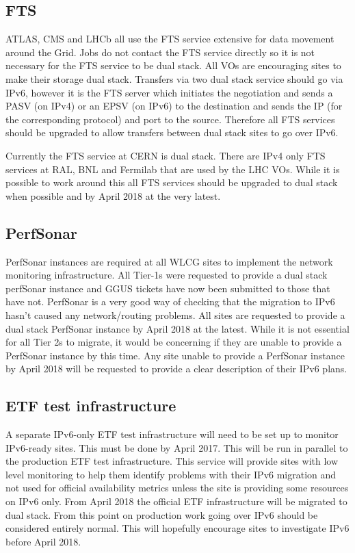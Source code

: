 \documentclass[a4paper]{jpconf}
\begin{document}
\subsection{FTS}
ATLAS, CMS and LHCb all use the FTS service extensive for data movement around the Grid.  Jobs do not contact the FTS service directly so it is not necessary for the FTS service to be dual stack.  All VOs are encouraging sites to make their storage dual stack.  Transfers via two dual stack service should go via IPv6, however it is the FTS server which initiates the negotiation and sends a PASV (on IPv4) or an EPSV (on IPv6) to the destination and sends the IP (for the corresponding protocol) and port to the source.  Therefore all FTS services should be upgraded to allow transfers between dual stack sites to go over IPv6.  

Currently the FTS service at CERN is dual stack.  There are IPv4 only FTS services at RAL, BNL and Fermilab that are used by the LHC VOs.  While it is possible to work around this all FTS services should be upgraded to dual stack when possible and by April 2018 at the very latest. 

\subsection{PerfSonar}
PerfSonar instances are required at all WLCG sites to implement the network monitoring infrastructure. All Tier-1s were requested to provide a dual stack perfSonar instance and GGUS tickets have now been submitted to those that have not.  PerfSonar is a very good way of checking that the migration to IPv6 hasn't caused any network/routing problems.  All sites are requested to provide a dual stack PerfSonar instance by April 2018 at the latest. While it is not essential for all Tier 2s to migrate, it would be concerning if they are unable to provide a PerfSonar instance by this time.  Any site unable to provide a PerfSonar instance by April 2018 will be requested to provide a clear description of their IPv6 plans.

\subsection{ETF test infrastructure}
A separate IPv6-only ETF test infrastructure will need to be set up to monitor IPv6-ready sites.   This must be done by April 2017.  This will be run in parallel to the production ETF test infrastructure.  This service will provide sites with low level monitoring to help them identify problems with their IPv6 migration and not used for official availability metrics unless the site is providing some resources on IPv6 only.  From April 2018 the official ETF infrastructure will be migrated to dual stack.  From this point on production work going over IPv6 should be considered entirely normal.  This will hopefully encourage sites to investigate IPv6 before April 2018.  
\end{document}
